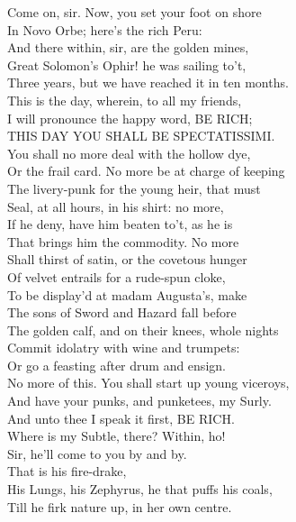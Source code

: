 \documentclass{memoir}
\begin{document}
\begin{drama*}
\mammonspeaks  Come on, sir. Now, you set your foot on shore\\
 In Novo Orbe; here's the rich Peru:\\
 And there within, sir, are the golden mines,\\
 Great Solomon's Ophir! he was sailing to't,\\
 Three years, but we have reached it in ten months.\\
 This is the day, wherein, to all my friends,\\
 I will pronounce the happy word, BE RICH;\\
 THIS DAY YOU SHALL BE SPECTATISSIMI.\\
 You shall no more deal with the hollow dye,\\
 Or the frail card. No more be at charge of keeping\\
 The livery-punk for the young heir, that must\\
 Seal, at all hours, in his shirt: no more,\\
 If he deny, have him beaten to't, as he is\\
 That brings him the commodity. No more\\
 Shall thirst of satin, or the covetous hunger\\
 Of velvet entrails for a rude-spun cloke,\\
 To be display'd at madam Augusta's, make\\
 The sons of Sword and Hazard fall before\\
 The golden calf, and on their knees, whole nights\\
 Commit idolatry with wine and trumpets:\\
 Or go a feasting after drum and ensign.\\
 No more of this. You shall start up young viceroys,\\
 And have your punks, and punketees, my Surly.\\
 And unto thee I speak it first, BE RICH.\\
 Where is my Subtle, there? Within, ho!\\
\facespeaks {} Sir, he'll come to you by and by.\\
\mammonspeaks {} That is his fire-drake,\\
 His Lungs, his Zephyrus, he that puffs his coals,\\
 Till he firk nature up, in her own centre.\\

\end{drama*}
\end{document}
